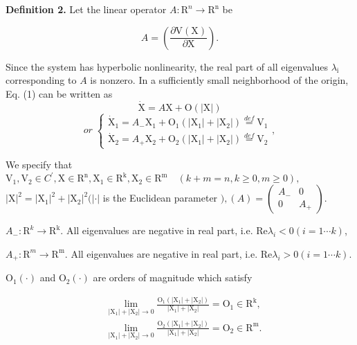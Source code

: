 \documentclass[11pt]{diazessay} %
\begin{document}
\vskip 8pt
\textbf{Definition 2.} \cite{3}
Let the linear operator $ A: \mathrm{R}^{n} \rightarrow \mathrm{R}^{\mathrm{n}}$ be 

$$ A=\left(\frac{\partial \mathrm{V}(\mathrm{X})}{\partial \mathrm{X}}\right).$$

\noindent
Since the system has hyperbolic nonlinearity, the real part of all eigenvalues $ \lambda_{\mathrm{i}}  $ corresponding to $  A  $ is nonzero.
In a sufficiently small neighborhood of the origin, Eq. (1) can be written as  
$$\dot{\mathrm{X}}=A \mathrm{X}+\mathrm{O}(|\mathrm{X}|)$$
\begin{equation}
or \; \left\{\begin{array}{l}\dot{\mathrm{X}}_{1}=A_{-} \mathrm{X}_{1}+\mathrm{O}_{1}\left(\left|\mathrm{X}_{1}\right|+\left|\mathrm{X}_{2}\right|\right) \stackrel{def }{=} \mathrm{V}_{1} \\ \dot{\mathrm{X}}_{2}=A_{+} \mathrm{X}_{2}+\mathrm{O}_{2}\left(\left|\mathrm{X}_{1}\right|+\left|\mathrm{X}_{2}\right|\right) \stackrel{ def }{=} \mathrm{V}_{2}\end{array}\right., 
\end{equation}

\noindent
We specify that $ \mathrm{V}_{1}, \mathrm{V}_{2} \in C^{\prime}, \mathrm{X} \in \mathrm{R}^{\mathrm{n}}, \mathrm{X}_{1} \in \mathrm{R}^{\mathrm{k}}, \mathrm{X}_{2} \in \mathrm{R}^{\mathrm{m}} \quad(k+m=n, k \geq 0, m \geq 0),$
$|\mathrm{X}|^{2}=   \left|\mathrm{X}_{1}\right|^{2}+\left|\mathrm{X}_{2}\right|^{2}(| \cdot| $  is the Euclidean parameter  $ ) ,(A)=\left(\begin{array}{cc}A_{-} & 0 \\ 0 & A_{+}\end{array}\right) $.

\noindent
$A_{-}: \mathrm{R}^{k} \rightarrow \mathrm{R}^{\mathrm{k}}.  $ All eigenvalues are negative in real part, i.e.  $\mathrm{Re} \lambda_{i}<0(i=1 \cdots k) $,

\noindent
$A_{+}: \mathrm{R}^{m} \rightarrow \mathrm{R}^{\mathrm{m}}.  $ All eigenvalues are negative in real part, i.e.  $\mathrm{Re} \lambda_{i}>0(i=1 \cdots k) $.

\noindent
$\mathrm{O}_{1}\left( \cdot \right)$ and $\mathrm{O}_{2}\left( \cdot \right)$ are orders of magnitude which satisfy

\begin{equation*}
	\begin{aligned}
		& \lim _{\left|\mathrm{X}_1\right|+\left|\mathrm{X}_2\right| \rightarrow 0} \frac{\mathrm{O}_1\left(\left|\mathrm{X}_1\right|+\left|\mathrm{X}_2\right|\right)}{\left|\mathrm{X}_1\right|+\left|\mathrm{X}_2\right|}=\mathrm{O}_1 \in \mathrm{R}^{\mathrm{k}} ,\\
		& \lim _{\left|\mathrm{X}_1\right|+\left|\mathrm{X}_2\right| \rightarrow 0} \frac{\mathrm{O}_2\left(\left|\mathrm{X}_1\right|+\left|\mathrm{X}_2\right|\right)}{\left|\mathrm{X}_1\right|+\left|\mathrm{X}_2\right|}=\mathrm{O}_2 \in \mathrm{R}^{\mathrm{m}} .
		\end{aligned}
\end{equation*}
\end{document}
